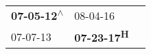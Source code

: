 \begin{supertabular}{lll}
 \textbf{07-05-12\textsuperscript{$\wedge$}} &            08-04-16\textsuperscript{} \\
                  07-07-13\textsuperscript{} &  \textbf{07-23-17\textsuperscript{H}} \\
\end{supertabular}
